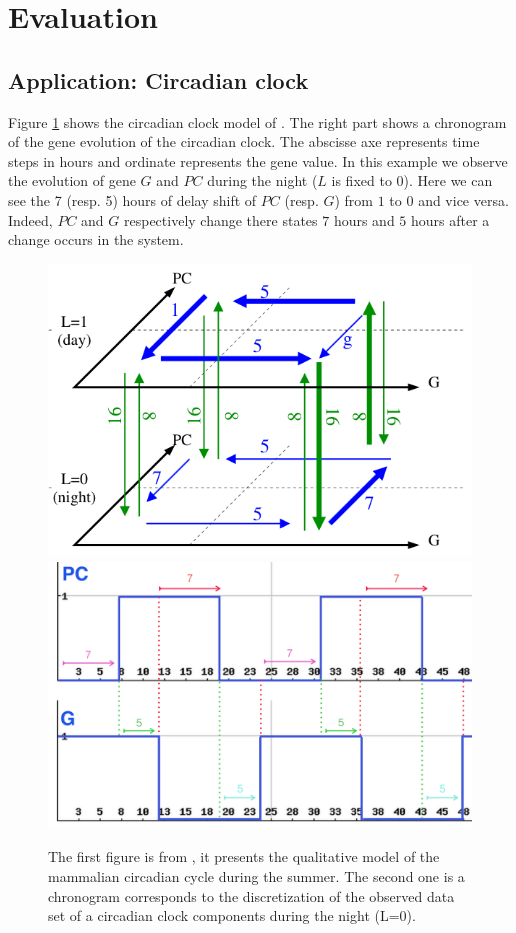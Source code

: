 \section{Evaluation}
\label{sec:evaluation}
\subsection{Application: Circadian clock}

Figure \ref{fig:circadian_clock} shows the circadian clock model of \cite{comet2012simplified}.
The right part shows a chronogram of the gene evolution of the circadian clock.
The abscisse axe represents time steps in hours and ordinate represents the gene value.
In this example we observe the evolution of gene $G$ and $PC$ during the night ($L$ is fixed to 0).
Here we can see the 7 (resp. 5) hours of delay shift of $PC$ (resp. $G$) from $1$ to $0$ and vice versa.
Indeed, $PC$ and $G$ respectively change there states $7$ hours and $5$ hours after a change occurs in the system.

\begin{figure}[htb!]
\begin{center}
\includegraphics[width=0.4\linewidth]{images/circadianClock-summer.png}
\includegraphics[width=0.4\linewidth]{images/circadianClock-Courb.png}
\end{center}
\caption{The first figure is from \cite{comet2010formal}, it presents the qualitative model of the mammalian circadian cycle during the summer. The second one is a chronogram corresponds to the discretization of the observed data set of a circadian clock components during the night (L=0).}
\label{fig:circadian_clock}
\end{figure}

